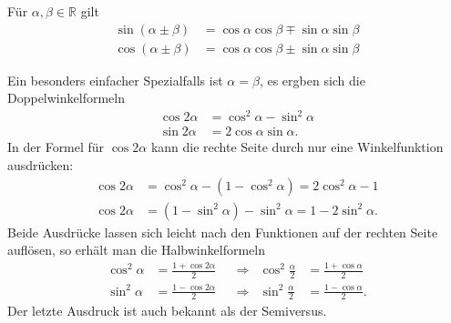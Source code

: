\begin{satz}
Für $\alpha,\beta\in\mathbb{R}$ gilt
\begin{align*}
\sin(\alpha\pm\beta)
&=
\cos\alpha\cos\beta\mp\sin\alpha\sin\beta
\\
\cos(\alpha\pm\beta)
&=
\cos\alpha\cos\beta\pm\sin\alpha\sin\beta
\end{align*}
\end{satz}

Ein besonders einfacher Spezialfalls ist $\alpha=\beta$, es ergben sich die
Doppelwinkelformeln
\begin{align*}
\cos2\alpha &= \cos^2\alpha-\sin^2\alpha
\\
\sin2\alpha &= 2\cos\alpha\sin\alpha.
\end{align*}
In der Formel für $\cos2\alpha$ kann die rechte Seite durch nur
eine Winkelfunktion ausdrücken:
\begin{align*}
\cos2\alpha &= \cos^2\alpha - (1-\cos^2\alpha) = 2\cos^2\alpha -1
\\
\cos2\alpha &= (1-\sin^2\alpha) - \sin^2\alpha = 1-2\sin^2\alpha.
\end{align*}
Beide Ausdrücke lassen sich leicht nach den Funktionen auf der rechten
Seite auflösen, so erhält man die Halbwinkelformeln
\begin{align*}
\cos^2\alpha &= \frac{1+\cos2\alpha}2
&&\Rightarrow&
\cos^2\frac{\alpha}2 &=\frac{1+\cos\alpha}2
\\
\sin^2\alpha &= \frac{1-\cos2\alpha}2
&&\Rightarrow&
\sin^2\frac{\alpha}2 &= \frac{1-\cos\alpha}2.
\end{align*}
Der letzte Ausdruck ist auch bekannt als der Semiversus.

